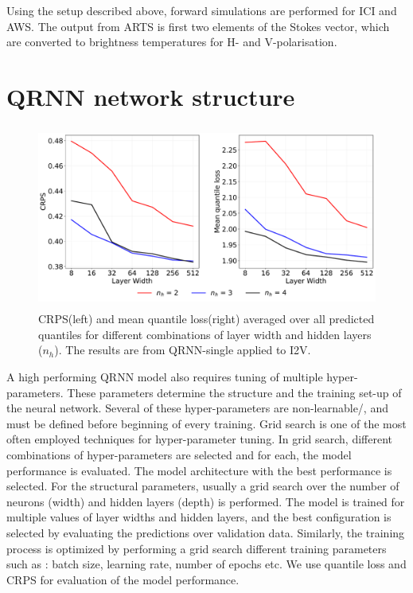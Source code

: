 \documentclass[amt, manuscript]{copernicus}
\begin{document}
Using the setup described above, forward simulations are performed for ICI and AWS. The output from ARTS is first two elements of the Stokes vector,  which are converted to brightness temperatures for H- and V-polarisation. 

\section{QRNN network structure}
\label{appendix:hyperparamter}
%
\begin{figure}[t]
	\centering
	\includegraphics[height=60mm]{Figures/CRPS.pdf} 
	\caption{CRPS(left) and mean quantile loss(right) averaged over all predicted quantiles for different combinations of layer width and hidden layers ($n_h$). The results are from QRNN-single applied to I2V.}
	\label{fig:grid_search}	
\end{figure}
A high performing QRNN model also requires tuning of multiple hyper-parameters. These parameters determine the structure and the training set-up of the neural network. Several of these hyper-parameters are non-learnable/, and must be defined before beginning of every training. Grid search is one of the most often employed techniques for hyper-parameter tuning. In grid search, different combinations of hyper-parameters are selected and for each, the model performance is evaluated. The model architecture with the best performance is selected. For the structural parameters, usually a grid search over the number of neurons (width) and hidden layers (depth) is performed. The model is trained for multiple values of layer widths and hidden layers, and the best configuration is selected by evaluating the predictions over validation data. Similarly, the training process is optimized by performing a grid search different training parameters such as : batch size, learning rate, number of epochs etc. We use quantile loss and CRPS for evaluation of the model performance.
\end{document}
